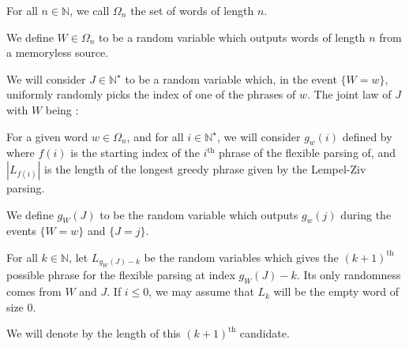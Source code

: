 

\begin{df}
For all $n\in\mathbb{N}$, we call $\Omega_n$ the set 
of words of length $n$.
\end{df}

\begin{df}
We define $W \in \Omega_n$ to be a random variable which outputs 
words of length $n$ from a memoryless source.
\end{df}

\begin{df}
We will consider $J \in \mathbb{N}^{\star}$ to be a random
variable which, in the event $\{ W = w \}$,
uniformly randomly picks the index of
one of the phrases of $w$.
The joint law of $J$ with $W$ being :

\end{df}

\begin{df}
For a given word $w\in\Omega_n$, 
and for all $i\in\mathbb{N}^{\star}$, 
we will consider $g_w(i)$ defined by
where $f(i)$ is the starting index
of the $i^{\text{th}}$ phrase of the flexible parsing of,
and $|L_{f(i)}|$ is the length of the longest greedy phrase
given by the Lempel-Ziv parsing.
\end{df}

\begin{df}
We define $g_W(J)$ to be the random variable which
outputs $g_w(j)$ during the events $\{ W=w \}$ and $\{ J = j \}$.
\end{df}

\begin{df}
For all $k \in \mathbb{N}$, let $L_{g_W(J) - k}$ be the random
variables which gives the $(k+1)^{\text{th}}$ possible phrase 
for the flexible parsing at index $g_W(J) - k$. 
Its only randomness comes from $W$ and $J$. 
If $i\leq 0$, we may assume that $L_k$ will be the empty word of 
size 0.
\end{df}


\begin{nota}
    We will denote by
    \noindent the length of this $(k+1)^{\text{th}}$ candidate.
\end{nota}


